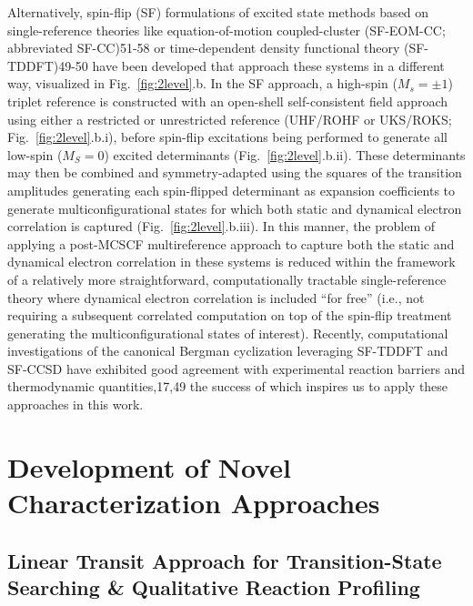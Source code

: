\documentclass[aip,jcp,preprint,superscriptaddress,floatfix]{revtex4-1}
\begin{document}
Alternatively, spin-flip (SF) formulations of excited state methods based on
single-reference theories like equation-of-motion coupled-cluster (SF-EOM-CC;
abbreviated SF-CC)51-58 or time-dependent density functional theory
(SF-TDDFT)49-50 have been developed that approach these systems in a different
way, visualized in Fig.~\ref{fig:2level}.b.  In the SF approach, a high-spin
($M_s = \pm1$) triplet reference is constructed with an open-shell
self-consistent field approach using either a restricted or unrestricted
reference (UHF/ROHF or UKS/ROKS; Fig.~\ref{fig:2level}.b.i), before spin-flip
excitations being performed to generate all low-spin ($M_S = 0$) excited
determinants (Fig.~\ref{fig:2level}.b.ii). These determinants may then be
combined and symmetry-adapted using the squares of the transition amplitudes
generating each spin-flipped determinant as expansion coefficients to generate
multiconfigurational states for which both static and dynamical electron
correlation is captured (Fig.~\ref{fig:2level}.b.iii).  In this manner, the
problem of applying a post-MCSCF multireference approach to capture both the
static and dynamical electron correlation in these systems is reduced within
the framework of a relatively more straightforward, computationally tractable
single-reference theory where dynamical electron correlation is included ``for
free'' (i.e., not requiring a subsequent correlated computation on top of the
spin-flip treatment generating the multiconfigurational states of interest).
Recently, computational investigations of the canonical Bergman cyclization
leveraging SF-TDDFT and SF-CCSD have exhibited good agreement with experimental
reaction barriers and thermodynamic quantities,17,49  the success of which
inspires us to apply these approaches in this work. 

\section{Development of Novel Characterization Approaches\label{sec:dev}}

\subsection{Linear Transit Approach for Transition-State Searching \&
Qualitative Reaction Profiling\label{subsec:lintransit}}
\end{document}
